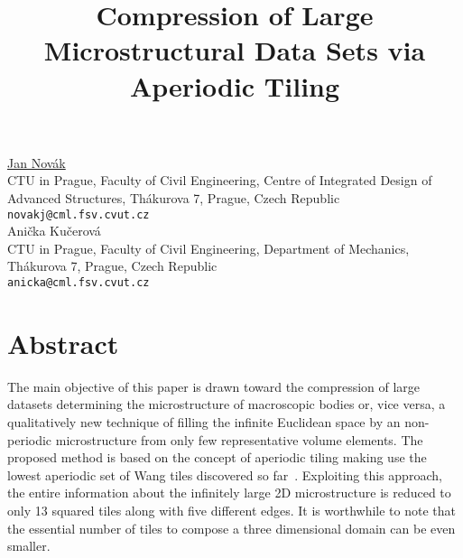 

\title{Compression of Large Microstructural Data Sets via Aperiodic Tiling}
\author{} \institute{} %
 \maketitle
\begin{center}
{\large \underline{Jan Nov\'{a}k}}\\
CTU in Prague, Faculty of Civil Engineering, Centre of Integrated Design of Advanced Structures, Th\'akurova 7, Prague, Czech Republic\\
{\tt novakj@cml.fsv.cvut.cz}\\
\vspace{4mm} %
{\large Ani\v{c}ka Ku\v{c}erov\'{a}}\\
CTU in Prague, Faculty of Civil Engineering, Department of Mechanics, Th\'akurova 7, Prague, Czech Republic\\
{\tt anicka@cml.fsv.cvut.cz}\\
\end{center}

\renewcommand{\note}[1]{{\noindent\color{red}[#1]}}

\section*{Abstract}

The main objective of this paper is drawn toward the compression of large datasets determining the microstructure of macroscopic bodies or, vice versa, a qualitatively new technique of filling the infinite Euclidean space by an non-periodic microstructure from only few representative volume elements.
The proposed method is based on the concept of aperiodic tiling making use the lowest aperiodic set of Wang tiles discovered so far~\cite{Culik96}. Exploiting this approach, the entire information about the infinitely large 2D microstructure is reduced to only 13 squared tiles along with five different edges. It is worthwhile to note that the essential number of tiles to compose a three dimensional domain can be even smaller.

